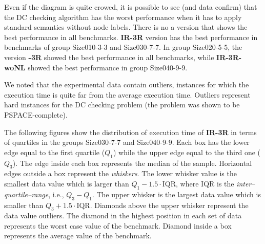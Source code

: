 \documentclass[a4paper,11pt]{article}
\begin{document}
Even if the diagram is quite crowed, it is possible to see (and data confirm) that the DC checking algorithm has the worst performance when it has to 
apply standard semantics without node labels. There is no a version that shows the best performance in all benchmarks. \textbf{IR-3R} version has the best performance in benchmarks of group Size010-3-3 and Size030-7-7.
In group Size020-5-5, the version \textbf{\textepsilon-3R} showed the best performance in all benchmarks, while \textbf{IR-3R-woNL} showed the best performance in group Size040-9-9.

We noted that the experimental data contain outliers, instances for which the execution time is quite far from the average execution time.
Outliers represent hard instances for the DC checking problem (the problem was shown to be PSPACE-complete).

The following figures show the distribution of execution time of \textbf{IR-3R} in terms of quartiles in the groups Size030-7-7 and Size040-9-9. 
Each box has the lower edge equal to the first quartile ($Q_1$) while the upper edge equal to the third one ($Q_3$).
The edge inside each box represents the median of the sample.
Horizontal edges outside a box represent the \textit{whiskers}. The lower whisker value is the smallest data value which is larger than $Q_1-1.5\cdot \mathrm{IQR}$, where IQR is the \textit{inter–quartile–range}, i.e.,  $Q_3-Q_1$. The upper whisker is the largest data value which is smaller than $Q_3+1.5\cdot \mathrm{IQR}$. 
Diamonds above the upper whisker represent the data value outliers. 	The diamond in the highest position in each set of data represents the worst case value of the benchmark. Diamond inside a box represents the average value of the benchmark.
\smallskip
\end{document}
